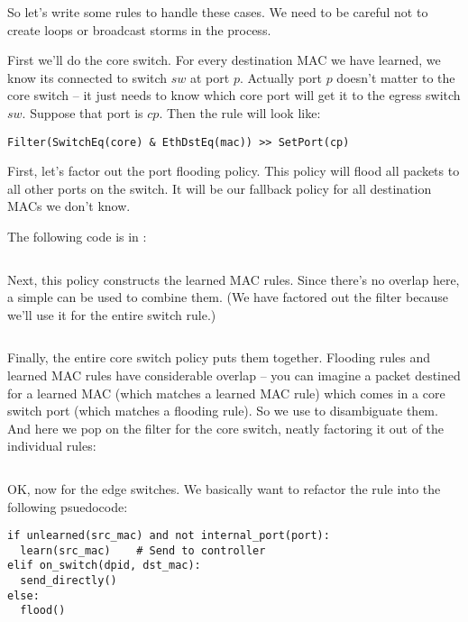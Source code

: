 So let's write some rules to handle these cases.  We need to be careful not to create loops or broadcast
storms in the process.  

First we'll do the core switch.  For every destination MAC we have learned, we know its connected to
switch $sw$ at port $p$.  Actually port $p$ doesn't matter to the core switch -- it just needs to know
which core port will get it to the egress switch $sw$.  Suppose that port is $cp$.  Then the rule will look
like:

\begin{verbatim}
Filter(SwitchEq(core) & EthDstEq(mac)) >> SetPort(cp) 
\end{verbatim}

First, let's factor out the port flooding policy. 
This policy will flood all packets to all other ports on the switch.  
It will be our fallback policy for all destination MACs
we don't know.  

The following code is in :

\inputminted[firstline=22,lastline=31]{python}{code/multiswitch_topologies/multiswitch2.py}

Next, this policy constructs the learned MAC rules.  Since there's no overlap here, a simple
 can be used to combine them.  (We have factored out the  filter
because we'll use it for the entire switch rule.)

\inputminted[firstline=60,lastline=68]{python}{code/multiswitch_topologies/multiswitch2.py}

Finally, the entire core switch policy puts them together.  Flooding rules and learned MAC rules have
considerable overlap -- you can imagine a packet destined for a learned MAC (which matches a learned
MAC rule) which comes in a core switch port (which matches a flooding rule).  So we use 
to disambiguate them.  And here we pop on the filter for the core switch, neatly factoring it out 
of the individual rules:

\inputminted[firstline=70,lastline=78]{python}{code/multiswitch_topologies/multiswitch2.py}

OK, now for the edge switches.  We basically want to refactor the rule into the following psuedocode:

\begin{verbatim}
if unlearned(src_mac) and not internal_port(port):  
  learn(src_mac)    # Send to controller
elif on_switch(dpid, dst_mac):
  send_directly()
else:
  flood()
\end{verbatim}

